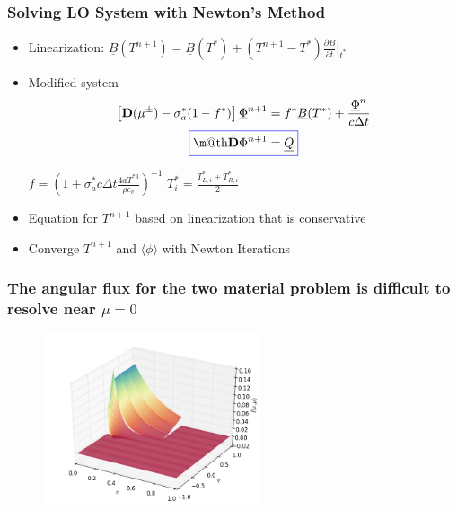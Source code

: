 \documentclass[xcolor=dvipsnames,hyperref={pdfpagelabels=false},unknownkeysallowed]{beamer}
\makeatletter
\newcommand*{\boxedcolor}{blue}
\renewcommand{\boxed}[1]{\textcolor{\boxedcolor}{%
  \fbox{\normalcolor\m@th$\displaystyle#1$}}}
\renewcommand{\u}[1]{\underline{#1}}
\newlength{\wideitemsep}
\let\olditem\item
\renewcommand{\item}{\setlength{\itemsep}{\wideitemsep}\olditem}
\newcommand{\pderiv}[2]{\frac{\partial #1}{\partial #2}}
\newcommand{\B}[1]{\ensuremath{\mathbf{#1}}}
\newcommand{\mom}[1]{\langle #1 \rangle}
\makeatother
\begin{document}
\begin{frame}
    \frametitle{Solving LO System with Newton's Method}
    \begin{block}{}
    \begin{itemize}
        \item Linearization: $\displaystyle \u B(T^{n+1}) = \u B(T^*) + \left(T^{n+1} -
                T^*\right) \pderiv{\u B}{t}\bigg|_{t^*}$
        \vspace{-0.15in}
        \item Modified system
            \begin{gather*}
                \displaystyle \left[\B  D(\mu^\pm) - \sigma_a^*(1-f^*) \right]\underline
                \Phi^{n+1}  = f^* \u B(T^*) + \frac{ \underline \Phi^n}{c\Delta t} \\
                \boxed{\hat{ \B  D }\Phi^{n+1} = \underline Q}
            \end{gather*}
        \vspace{-0.07in}
        \begin{center}
         $\displaystyle f = \left( 1 + \sigma_a^*c \Delta t \frac{4aT^{*3}}{\rho
            c_v} \right)^{-1}$  \hspace{0.3in}
         $\displaystyle T_i^* = \frac{T^{*}_{L,i}+T^{*}_{R,i}}{2}$
     \end{center}
 \item Equation for $T^{n+1}$ based on linearization that is conservative
 \item Converge $T^{n+1}$ and $\mom{\phi}$ with Newton Iterations
 \end{itemize}
 \end{block}
\end{frame}

\begin{frame}   
    \frametitle{The angular flux for the two material problem is difficult to resolve near
    $\mu=0$}
    \begin{figure}
        \includegraphics[width=0.57\textwidth]{ang_flux.png}
    \end{figure}
\end{frame}
\end{document}
